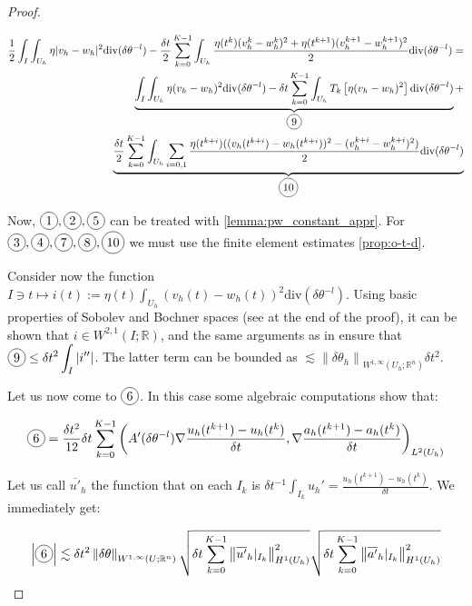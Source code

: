 \documentclass[english,a4paper,10pt,oneside]{scrbook}	%
\theoremstyle{break}
\newenvironment{mproof}[1][\proofname]{%
  \begin{proof}[#1]$ $\par\nobreak\ignorespaces
}{%
  \end{proof}
}
\renewcommand*{\proofname}{Proof}
\theoremstyle{remark}
\newcommand{\mR}{\mathbb{R}}
\newcommand{\ds}{\displaystyle}
\newcommand{\norm}[1]{\left\lVert#1\right\rVert}
\newcommand{\te}{\theta}
\newcommand{\dive}{\text{div}}
\newcommand*\circled[1]{\tikz[baseline=(char.base)]{
            \node[shape=circle,draw,inner sep=2pt] (char) {#1};}}
\begin{document}
\begin{mproof}
\begin{align*}
\frac{1}{2} \int_I \int_{U_h} \eta |v_h-w_h|^2\dive(\delta \te^{-l}) - \frac{\delta t}{2} \sum_{k=0}^{K-1} \int_{U_h}\frac{\eta(t^k)(v_h^k-w_h^k)^2 + \eta(t^{k+1})(v_h^{k+1}-w_h^{k+1})^2}{2}\dive(\delta \te^{-l}) = \\
\underbrace{\int_I \int_{U_h}\eta(v_h-w_h)^2\dive(\delta \te^{-l}) - \delta t \sum_{k=0}^{K-1}\int_{U_h} T_k \left [ \eta(v_h-w_h)^2 \right] \dive(\delta \te^{-l})}_{\circled{9}} +\\
\underbrace{\frac{\delta t}{2} \sum_{k=0}^{K-1} \int_{U_h}\sum_{i=0,1}\frac{\eta(t^{k+i})((v_h(t^{k+i})-w_h(t^{k+i}))^2 -(v_h^{k+i}-w_h^{k+i})^2)}{2}\dive(\delta \te^{-l})}_{\circled{10}}
\end{align*}

Now, $\circled{1}, \circled{2}, \circled{5}$ can be treated with \cref{lemma:pw_constant_appr}.
For $\circled{3}, \circled{4}, \circled{7}, \circled{8}, \circled{10}$ we must use the finite element estimates \cref{prop:o-t-d}.

Consider now the function $I \ni t \mapsto \ds i(t):= \eta(t)\int_{U_h}(v_h(t)-w_h(t))^2\dive(\delta \te^{-l})$. Using basic properties of Sobolev and Bochner spaces (see at the end of the proof), it can be shown that $i \in W^{2,1}(I; \mR)$, and the same arguments as in \cite{trapezoidal} ensure that $\ds\circled{9} \leq \delta t^2 \int_I |i''|$. The latter term can be bounded as $\lesssim \norm{\delta \te_h}_{W^{1,\infty}(U_h;\mR^n)} \delta t^2$.


Let us now come to $\circled{6}$. In this case some algebraic computations show that:

\begin{align*}
\circled{6} = \frac{\delta t^2}{12} \delta t \sum_{k=0}^{K-1} \left ( A'(\delta \te^{-l}) \nabla \frac{u_h(t^{k+1})-u_h(t^{k})}{\delta t}, \nabla  \frac{a_h(t^{k+1})-a_h(t^{k})}{\delta t} \right )_{L^2(U_h)}
\end{align*}

Let us call $\overline{u'}_h$ the function that on each $I_k$ is $\delta t^{-1}\ds \int_{I_k} u_h' = \frac{u_h(t^{k+1})-u_h(t^{k})}{\delta t}$. We immediately get:

\begin{align*}
\left | \circled{6} \right | \lesssim \delta t^2 \ds \norm{\delta \te}_{W^{1,\infty}(U;\mR^n)}\sqrt{\delta t \sum_{k=0}^{K-1} \norm{{\overline{u'}_h}|_{I_k}}_{H^1(U_h)}^2}\sqrt{\delta t \sum_{k=0}^{K-1} \norm{{\overline{a'}_h}|_{I_k}}_{H^1(U_h)}^2}
\end{align*}


\end{mproof}
\end{document}
